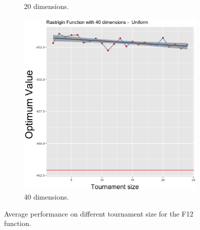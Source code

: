 \begin{figure}[t]
\begin{subfigure}[b]{0.33\textwidth}
		\caption{20 dimensions.}
	\end{subfigure}
	\begin{subfigure}[b]{0.33\textwidth}
		\centering
		\includegraphics[width=\textwidth]{img/multimodal_uniform_3_dim_40.png}
		\caption{40 dimensions.}
	\end{subfigure}
	\caption{Average performance on different tournament size for the F12 function.}
	\label{12}
\end{figure}


